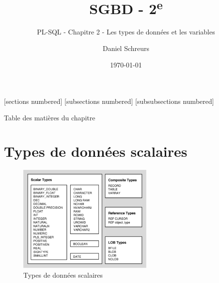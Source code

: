 \documentclass[10pt]{beamer}
\title{SGBD - 2\textsuperscript{e}}
\subtitle{PL-SQL - Chapitre 2 - Les types de données et les variables}
\date{\today}
\author{Daniel Schreurs}
\institute{Haute École de Province de Liège}
\begin{document}
\maketitle

[sections numbered]
[subsections numbered]
[subsubsections numbered]
\begin{frame}[allowframebreaks]{Table des matières du chapitre}
    \tableofcontents[subsectionstyle=show/show/hide,subsubsectionstyle=show/show/hide,]
\end{frame}

\section{Types de données scalaires}
\tocss
\begin{frame}{\secname}
    \begin{figure}
        \begin{center}
            \includegraphics[width=0.60\textwidth]{../assets/img/scalar-type.png}
            \caption{Types de données scalaires}
        \end{center}
    \end{figure}
\end{frame}
\end{document}
